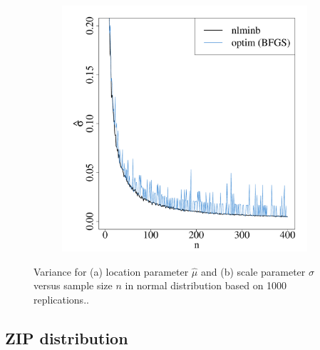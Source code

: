 \documentclass[nojss]{jss}
\begin{document}
\begin{appendix}
\begin{figure}[ht]
\begin{subfigure}[h]{0.49\textwidth}
        \includegraphics[width=\textwidth]{article-varnorm_b}
        \caption{\label{fig:varnormb}}
    \end{subfigure}
\caption{\label{fig:varnorm}  Variance for (a) location parameter $\hat{\mu}$ and (b) scale parameter $\hat{\sigma}$ versus sample size $n$ in normal distribution based on 1000 replications..}
\vspace{-20pt}
\end{figure}

\subsection{ZIP distribution}




\end{appendix}
\end{document}
